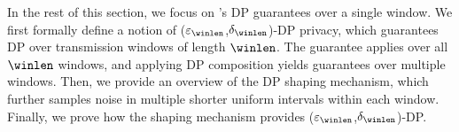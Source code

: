 
In the rest of this section, we focus on {\sys}'s DP guarantees over a single
window.
We first formally define a notion of ($\varepsilon_\winlen$,$\delta_\winlen$)-DP
privacy, which guarantees DP over transmission windows of length $\winlen$.
The guarantee applies over all $\winlen$ windows, and applying DP
composition yields guarantees over multiple windows.
Then, we provide an overview of the DP shaping mechanism, which further samples
noise in multiple shorter uniform intervals within each window.
Finally, we prove how the shaping mechanism provides
($\varepsilon_\winlen$,$\delta_\winlen$)-DP.

